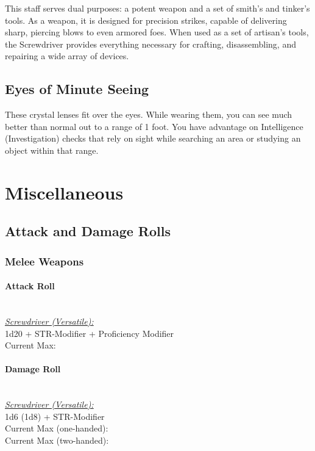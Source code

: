 {This staff serves dual purposes: a potent weapon and a set of smith's and tinker's tools. As a weapon, it is designed for precision strikes, capable of delivering sharp, piercing blows to even armored foes. When used as a set of artisan's tools, the Screwdriver provides everything necessary for crafting, disassembling, and repairing a wide array of devices.

\subsection*{Eyes of Minute Seeing}
These crystal lenses fit over the eyes. While wearing them, you can see much better than normal out to a range of 1 foot. You have advantage on Intelligence (Investigation) checks that rely on sight while searching an area or studying an object within that range.

\vfill\eject
\section*{Miscellaneous}
\subsection*{Attack and Damage Rolls}
\subsubsection*{Melee Weapons}
\paragraph*{Attack Roll}\hfill\\
\underline{\textit{Screwdriver (Versatile):}}\\
1d20 + STR-Modifier + Proficiency Modifier\\
\indent Current Max: 
\paragraph*{Damage Roll}\hfill\\
\underline{\textit{Screwdriver (Versatile):}}\\
1d6 (1d8) + STR-Modifier\\
\indent Current Max (one-handed): \\
\indent Current Max (two-handed): 
}
